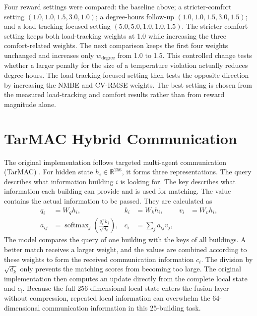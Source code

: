 Four reward settings were compared: the baseline above; a stricter-comfort
setting $(1.0,1.0,1.5,3.0,1.0)$; a degree-hours follow-up
$(1.0,1.0,1.5,3.0,1.5)$; and a load-tracking-focused setting
$(5.0,5.0,1.0,1.0,1.5)$. The stricter-comfort setting keeps both load-tracking
weights at 1.0 while increasing the three comfort-related weights. The next
comparison keeps the first four weights unchanged and increases only
$w_{\mathrm{degree}}$ from 1.0 to 1.5. This controlled change tests whether a
larger penalty for the size of a temperature violation actually reduces
degree-hours. The load-tracking-focused setting then tests the opposite
direction by increasing the NMBE and CV-RMSE weights. The best setting is chosen
from the measured load-tracking and comfort results rather than from reward
magnitude alone.

\section{TarMAC Hybrid Communication}

The original implementation follows targeted multi-agent communication
(TarMAC) \cite{tarmac2019}. For hidden state $h_i\in\mathbb{R}^{256}$, it forms
three representations. The query describes what information building $i$ is
looking for. The key describes what information each building can provide and
is used for matching. The value contains the actual information to be passed.
They are calculated as
\begin{align}
q_i &= W_q h_i, & k_i &= W_k h_i, & v_i &= W_v h_i,\\
a_{ij} &= \operatorname{softmax}_j\left(\frac{q_i^\top k_j}{\sqrt{d_k}}\right),
& c_i &= \sum_j a_{ij}v_j,
\end{align}
The model compares the query of one building with the keys of all buildings.
A better match receives a larger weight, and the values are combined according
to these weights to form the received communication information $c_i$. The
division by $\sqrt{d_k}$ only prevents the matching scores from becoming too
large. The original implementation then computes an update directly from the
complete local state and $c_i$. Because the full 256-dimensional local state
enters the fusion layer without compression, repeated local information can
overwhelm the 64-dimensional communication information in this 25-building task.

